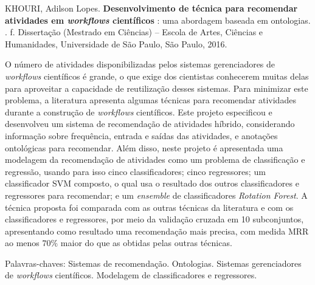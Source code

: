 \documentclass[
	12pt,				%
	oneside,			%
	a4paper,			%
	english,			%
	brazil				%
	]{abntex2ppgsi}
\numberwithin{equation}{section}
\begin{document}

\setlength{\absparsep}{18pt} %
\begin{resumo}

% 
%
% 
%
\begin{flushleft}
KHOURI, Adilson Lopes. \textbf{Desenvolvimento de técnica para recomendar atividades em \emph{workflows} científicos }: uma abordagem baseada em ontologias. \imprimirdata. \pageref{LastPage} f. Dissertação (Mestrado em Ciências) – Escola de Artes, Ciências e Humanidades, Universidade de São Paulo, São Paulo, 2016.
\end{flushleft}

O número de atividades disponibilizadas pelos sistemas gerenciadores de \emph{workflows} científicos é grande, o que exige dos cientistas conhecerem muitas delas para aproveitar a capacidade de reutilização desses sistemas. Para minimizar este problema, a literatura apresenta algumas técnicas para recomendar atividades durante a construção de \emph{workflows} científicos. 
Este projeto especificou e desenvolveu um sistema de recomendação de atividades híbrido, considerando informação sobre frequência, entrada e saídas das atividades, e anotações ontológicas para recomendar. Além disso, neste projeto é apresentada uma modelagem da recomendação de atividades como um problema de classificação e regressão, usando para isso cinco classificadores; cinco regressores; um classificador SVM composto, o qual usa o resultado dos outros classificadores e regressores para recomendar; e um \emph{ensemble} de classificadores \emph{Rotation Forest}. A técnica proposta foi comparada com as outras técnicas da literatura e com os classificadores e regressores, por meio da validação cruzada em 10 subconjuntos, apresentando como resultado uma recomendação mais precisa, com medida MRR ao menos \(70\%\) maior do que as obtidas pelas outras técnicas.

Palavras-chaves: Sistemas de recomendação. Ontologias. Sistemas gerenciadores de \emph{workflows} científicos. Modelagem de classificadores e regressores.
\end{resumo}
\end{document}

